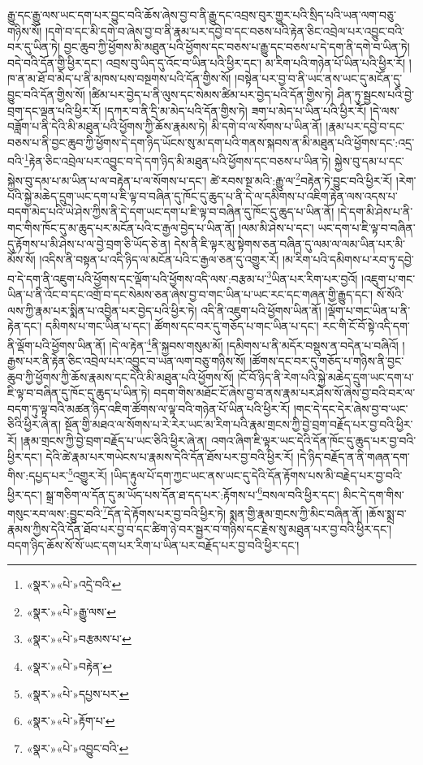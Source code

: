 རྒྱུ་དང་རྒྱུ་ལས་ཡང་དག་པར་བྱུང་བའི་ཆོས་ཞེས་བྱ་བ་ནི་རྒྱུ་དང་འབྲས་བུར་གྱུར་པའི་སྲིད་པའི་ཡན་ལག་བཅུ་གཉིས་སོ། །དགེ་བ་དང་མི་དགེ་བ་ཞེས་བྱ་བ་ནི་རྣམ་པར་དབྱེ་བ་དང་བཅས་པའི་རྟེན་ཅིང་འབྲེལ་པར་འབྱུང་བའི་བར་དུ་ཡིན་ཏེ། བྱང་ཆུབ་ཀྱི་ཕྱོགས་མི་མཐུན་པའི་ཕྱོགས་དང་བཅས་པ་རྒྱུ་དང་བཅས་པ་དེ་དག་ནི་དགེ་བ་ཡིན་ཏེ། བདེ་བའི་དོན་གྱི་ཕྱིར་དང་། འབྲས་བུ་ཡིད་དུ་འོང་བ་ཡིན་པའི་ཕྱིར་དང་། མ་རིག་པའི་གཉེན་པོ་ཡིན་པའི་ཕྱིར་རོ། །ཁ་ན་མ་ཐོ་བ་མེད་པ་ནི་མཁས་པས་བསྔགས་པའི་དོན་གྱིས་སོ། །བསྟེན་པར་བྱ་བ་ནི་ཡང་ནས་ཡང་དུ་མངོན་དུ་བྱུང་བའི་དོན་གྱིས་སོ། །ཚིམ་པར་བྱེད་པ་ནི་ལུས་དང་སེམས་ཚིམ་པར་བྱེད་པའི་དོན་གྱིས་ཏེ། ཤིན་ཏུ་སྦྱངས་པའི་བྱེ་བྲག་དང་ལྡན་པའི་ཕྱིར་རོ། །དཀར་བ་ནི་དྲི་མ་མེད་པའི་དོན་གྱིས་ཏེ། ཟག་པ་མེད་པ་ཡིན་པའི་ཕྱིར་རོ། །དེ་ལས་བཟློག་པ་ནི་དེའི་མི་མཐུན་པའི་ཕྱོགས་ཀྱི་ཆོས་རྣམས་ཏེ། མི་དགེ་བ་ལ་སོགས་པ་ཡིན་ནོ། །རྣམ་པར་དབྱེ་བ་དང་བཅས་པ་ནི་བྱང་ཆུབ་ཀྱི་ཕྱོགས་དེ་དག་ཉིད་ཡོངས་སུ་མ་དག་པའི་གནས་སྐབས་ན་མི་མཐུན་པའི་ཕྱོགས་དང་:འདྲ་བའི་\footnote{«སྣར་»«པེ་»འདྲེ་བའི་}རྟེན་ཅིང་འབྲེལ་པར་འབྱུང་བ་དེ་དག་ཉིད་མི་མཐུན་པའི་ཕྱོགས་དང་བཅས་པ་ཡིན་ཏེ། སྐྱེས་བུ་དམ་པ་དང་སྐྱེས་བུ་དམ་པ་མ་ཡིན་པ་ལ་བརྟེན་པ་ལ་སོགས་པ་དང་། ཚེ་རབས་སྔ་མའི་:རྒྱུ་ལ་\footnote{«སྣར་»«པེ་»རྒྱུ་ལས་}བརྟེན་ཏེ་བྱུང་བའི་ཕྱིར་རོ། །རེག་པའི་སྐྱེ་མཆེད་དྲུག་ཡང་དག་པ་ཇི་ལྟ་བ་བཞིན་དུ་ཁོང་དུ་ཆུད་པ་ནི་དེ་ལ་དམིགས་པ་འཇིག་རྟེན་ལས་འདས་པ་བདག་མེད་པའི་ཡེ་ཤེས་ཀྱིས་ནི་དེ་དག་ཡང་དག་པ་ཇི་ལྟ་བ་བཞིན་དུ་ཁོང་དུ་ཆུད་པ་ཡིན་ནོ། །དེ་དག་མི་ཤེས་པ་ནི་གང་གིས་ཁོང་དུ་མ་ཆུད་པར་མངོན་པའི་ང་རྒྱལ་བྱེད་པ་ཡིན་ནོ། །ལམ་མི་ཤེས་པ་དང་། ཡང་དག་པ་ཇི་ལྟ་བ་བཞིན་དུ་རྟོགས་པ་མི་ཤེས་པ་ལ་བྱེ་བྲག་ཅི་ཡོད་ཅེ་ན། དེས་ནི་ཇི་ལྟར་མུ་སྟེགས་ཅན་བཞིན་དུ་ལམ་ལ་ལམ་ཡིན་པར་མི་མོས་སོ། །འདིས་ནི་བསྟན་པ་འདི་ཉིད་ལ་མངོན་པའི་ང་རྒྱལ་ཅན་དུ་འགྱུར་རོ། །མ་རིག་པའི་དམིགས་པ་རབ་ཏུ་དབྱེ་བ་དེ་དག་ནི་འཇུག་པའི་ཕྱོགས་དང་ལྡོག་པའི་ཕྱོགས་འདི་ལས་:བརྩམ་པ་\footnote{«སྣར་»«པེ་»བརྩམས་པ་}ཡིན་པར་རིག་པར་བྱའོ། །འཇུག་པ་གང་ཡིན་པ་ནི་འོང་བ་དང་འགྲོ་བ་དང་སེམས་ཅན་ཞེས་བྱ་བ་གང་ཡིན་པ་ཡང་རང་དང་གཞན་གྱི་རྒྱུད་དང་། སོ་སོའི་ལས་ཀྱི་རྣམ་པར་སྨིན་པ་འབྱིན་པར་བྱེད་པའི་ཕྱིར་ཏེ། འདི་ནི་འཇུག་པའི་ཕྱོགས་ཡིན་ནོ། །ལྡོག་པ་གང་ཡིན་པ་ནི་རྟེན་དང་། དམིགས་པ་གང་ཡིན་པ་དང་། ཚོགས་དང་བར་དུ་གཅོད་པ་གང་ཡིན་པ་དང་། རང་གི་ངོ་བོ་སྟེ་འདི་དག་ནི་ལྡོག་པའི་ཕྱོགས་ཡིན་ནོ། །དེ་ལ་རྟེན་\footnote{«སྣར་»«པེ་»བརྟེན་}ནི་སྐྱབས་གསུམ་མོ། །དམིགས་པ་ནི་མདོར་བསྡུས་ན་བདེན་པ་བཞིའོ། །རྒྱས་པར་ནི་རྟེན་ཅིང་འབྲེལ་པར་འབྱུང་བ་ཡན་ལག་བཅུ་གཉིས་སོ། །ཚོགས་དང་བར་དུ་གཅོད་པ་གཉིས་ནི་བྱང་ཆུབ་ཀྱི་ཕྱོགས་ཀྱི་ཆོས་རྣམས་དང་དེའི་མི་མཐུན་པའི་ཕྱོགས་སོ། །ངོ་བོ་ཉིད་ནི་རེག་པའི་སྐྱེ་མཆེད་དྲུག་ཡང་དག་པ་ཇི་ལྟ་བ་བཞིན་དུ་ཁོང་དུ་ཆུད་པ་ཡིན་ཏེ། བདག་གིས་མཐོང་ངོ་ཞེས་བྱ་བ་ནས་རྣམ་པར་ཤེས་སོ་ཞེས་བྱ་བའི་བར་ལ་བདག་ཏུ་ལྟ་བའི་མཚན་ཉིད་འཇིག་ཚོགས་ལ་ལྟ་བའི་གཉེན་པོ་ཡིན་པའི་ཕྱིར་རོ། །གང་དེ་དང་དེར་ཞེས་བྱ་བ་ཡང་ཅིའི་ཕྱིར་ཞེ་ན། སྔོན་གྱི་མཐའ་ལ་སོགས་པ་རེ་རེར་ཡང་མ་རིག་པའི་རྣམ་གྲངས་ཀྱི་བྱེ་བྲག་བརྗོད་པར་བྱ་བའི་ཕྱིར་རོ། །རྣམ་གྲངས་ཀྱི་བྱེ་བྲག་བརྗོད་པ་ཡང་ཅིའི་ཕྱིར་ཞེ་ན། འགའ་ཞིག་ཇི་ལྟར་ཡང་དེའི་དོན་ཁོང་དུ་ཆུད་པར་བྱ་བའི་ཕྱིར་དང་། དེའི་ཚེ་རྣམ་པར་གཡེངས་པ་རྣམས་དེའི་དོན་ཐོས་པར་བྱ་བའི་ཕྱིར་རོ། །དེ་ཉིད་བརྗོད་ན་ནི་གཞན་དག་གིས་:དཔྱད་པར་\footnote{«སྣར་»«པེ་»དཔྱས་པར་}འགྱུར་རོ། །ཡིད་རྟུལ་པོ་དག་ཀྱང་ཡང་ནས་ཡང་དུ་དེའི་དོན་རྟོགས་པས་མི་བརྗེད་པར་བྱ་བའི་ཕྱིར་དང་། སྒྲ་གཅིག་ལ་དོན་དུ་མ་ཡོད་པས་དོན་ཐ་དད་པར་:རྟོགས་པ་\footnote{«སྣར་»«པེ་»རྟོག་པ་}བསལ་བའི་ཕྱིར་དང་། མིང་དེ་དག་གིས་གསུང་རབ་ལས་:བྱུང་བའི་\footnote{«སྣར་»«པེ་»འབྱུང་བའི་}དོན་དེ་རྟོགས་པར་བྱ་བའི་ཕྱིར་ཏེ། སྨན་གྱི་རྣམ་གྲངས་ཀྱི་མིང་བཞིན་ནོ། །ཆོས་སྨྲ་བ་རྣམས་ཀྱིས་དེའི་དོན་ཐོབ་པར་བྱ་བ་དང་ཚིག་ཉེ་བར་སྦྱར་བ་གཉིས་དང་རྗེས་སུ་མཐུན་པར་བྱ་བའི་ཕྱིར་དང་། བདག་ཉིད་ཆོས་སོ་སོ་ཡང་དག་པར་རིག་པ་ཡིན་པར་བརྗོད་པར་བྱ་བའི་ཕྱིར་དང་། 